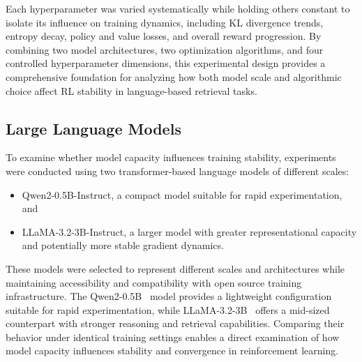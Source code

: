 Each hyperparameter was varied systematically while holding others constant to isolate its influence on training dynamics, including KL divergence trends, entropy decay, policy and value losses, and overall reward progression. By combining two model architectures, two optimization algorithms, and four controlled hyperparameter dimensions, this experimental design provides a comprehensive foundation for analyzing how both model scale and algorithmic choice affect RL stability in language-based retrieval tasks.

\subsection{Large Language Models}
To examine whether model capacity influences training stability, experiments were conducted using two transformer-based language models of different scales:
\begin{itemize}
    \item Qwen2-0.5B-Instruct, a compact model suitable for rapid experimentation, and
    \item LLaMA-3.2-3B-Instruct, a larger model with greater representational capacity and potentially more stable gradient dynamics.
\end{itemize}
These models were selected to represent different scales and architectures while maintaining accessibility and compatibility with open source training infrastructure. The Qwen2-0.5B~\cite{team2024qwen2} model provides a lightweight configuration suitable for rapid experimentation, while LLaMA-3.2-3B~\cite{Llama3_2_3B} offers a mid-sized counterpart with stronger reasoning and retrieval capabilities. Comparing their behavior under identical training settings enables a direct examination of how model capacity influences stability and convergence in reinforcement learning.

